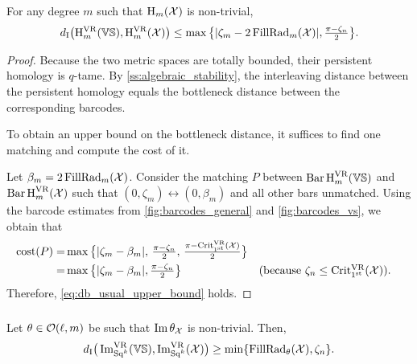 \subsubsection{}\label{subsub:db_upper_bound}

\medskip\lemma
For any degree $m$ such that $\opH_m(\cX)$ is non-trivial,
\begin{equation}\label{eq:db_usual_upper_bound}
    \di\big(\rH^{\VR}_{m}(\VS), \rH^{\VR}_{m}(\cX)\big) 
	\leq \max\big\{|\zeta_m  - 2\firstdeath{m}{\cX} |, \tfrac{\pi - \zeta_n}{2}\big\}.
\end{equation}

\begin{proof}
    Because the two metric spaces are totally bounded, their persistent homology is $q$-tame. 
    By \cref{ss:algebraic_stability}, the interleaving distance between the persistent homology equals the bottleneck distance between the corresponding barcodes.
    
    To obtain an upper bound on the bottleneck distance, it suffices to find one matching and compute the cost of it.
    
    Let $\beta_m = 2\firstdeath{m}{\cX}$.
	Consider the matching $P$ between $\Hbarc[\field]{m}{\VS}$ and $\Hbarc[\field]{m}{\cX}$ such that $(0,\zeta_m ) \leftrightarrow (0, \beta_m )$ and all other bars unmatched.
	Using the barcode estimates from \cref{fig:barcodes_general} and \cref{fig:barcodes_vs}, we obtain that %
	\begin{align*}
		\cost(P)
		= & \max\big\{|\zeta_m  - \beta_m |,\, \tfrac{\pi - \zeta_n}{2},\, \tfrac{\pi - \crit(\cX)}{2}\big\} \\
		= & \max\big\{|\zeta_m  - \beta_m |, \tfrac{\pi - \zeta_n}{2}\big\} && \mbox{(because $\zeta_n \leq \crit(\cX)$)}.
	\end{align*}
	Therefore, \cref{eq:db_usual_upper_bound} holds.
\end{proof}

\subsubsection{}\label{subsub:db_theta_lower_bound}

\medskip\lemma
Let $\theta \in \cO(\ell, m)$ be such that $\img \theta_\cX$ is non-trivial.
Then,
\begin{equation}\label{eq:db_theta_lower_bound}
	\di\big(\img^{\VR}_{\Sq^k}(\VS), \img^{\VR}_{\Sq^k}(\cX)\big)
	\geq \min\{\firstdeath{\theta}{\cX}, \zeta_n\}. %
\end{equation}

